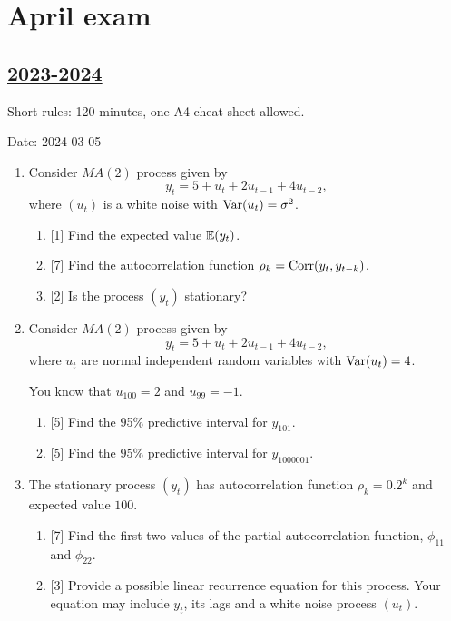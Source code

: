 
\newpage
\thispagestyle{empty}
\section{April exam}



\subsection[2023-2024]{\hyperref[sec:sol_kr_03_2023_2024]{2023-2024}}
\label{sec:kr_03_2023_2024} %

Short rules: 120 minutes, one A4 cheat sheet allowed. 

Date: 2024-03-05

\begin{enumerate}

\item Consider $MA(2)$ process given by 
\[
y_t = 5 + u_t + 2u_{t-1} + 4 u_{t-2},
\]
where $(u_t)$ is a white noise with $\operatorname{Var}(u_t) = \sigma^2$.

\begin{enumerate}
\item {[1]} Find the expected value $\operatorname{\mathbb{E}}(y_t)$.
\item {[7]} Find the autocorrelation function $\rho_k = \operatorname{Corr}(y_t, y_{t-k})$.
\item {[2]} Is the process $(y_t)$ stationary?
\end{enumerate}

\item Consider $MA(2)$ process given by 
\[
y_t = 5 + u_t + 2u_{t-1} + 4 u_{t-2},
\]
where $u_t$ are normal independent random variables with $\operatorname{Var}(u_t) = 4$.

You know that $u_{100} = 2$ and $u_{99} = -1$.

\begin{enumerate}
\item {[5]} Find the 95\% predictive interval for $y_{101}$.
\item {[5]} Find the 95\% predictive interval for $y_{1000001}$.
\end{enumerate}

\item The stationary process $(y_t)$ has autocorrelation function $\rho_k = 0.2^k$ and expected value $100$.
\begin{enumerate}
\item {[7]} Find the first two values of the partial autocorrelation function, $\phi_{11}$ and $\phi_{22}$.
\item {[3]} Provide a possible linear recurrence equation for this process. 
Your equation may include $y_t$, its lags and a white noise process $(u_t)$.
\end{enumerate}


\end{enumerate}
